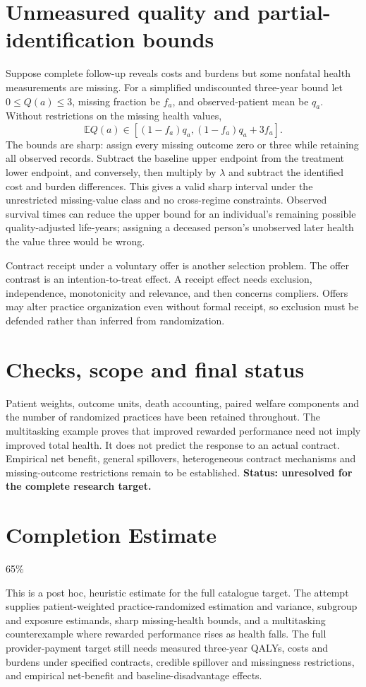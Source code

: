 \documentclass[11pt]{article}
\newcommand{\E}{\mathbb E}
\begin{document}
\section*{Unmeasured quality and partial-identification bounds}
Suppose complete follow-up reveals costs and burdens but some nonfatal health measurements are missing. For a simplified undiscounted three-year bound let $0\leq Q(a)\leq3$, missing fraction be $f_a$, and observed-patient mean be $q_a$. Without restrictions on the missing health values,
\[
 \E Q(a)\in[(1-f_a)q_a,(1-f_a)q_a+3f_a].
\]
The bounds are sharp: assign every missing outcome zero or three while retaining all observed records. Subtract the baseline upper endpoint from the treatment lower endpoint, and conversely, then multiply by $\lambda$ and subtract the identified cost and burden differences. This gives a valid sharp interval under the unrestricted missing-value class and no cross-regime constraints. Observed survival times can reduce the upper bound for an individual's remaining possible quality-adjusted life-years; assigning a deceased person's unobserved later health the value three would be wrong.

Contract receipt under a voluntary offer is another selection problem. The offer contrast is an intention-to-treat effect. A receipt effect needs exclusion, independence, monotonicity and relevance, and then concerns compliers. Offers may alter practice organization even without formal receipt, so exclusion must be defended rather than inferred from randomization.

\section*{Checks, scope and final status}
Patient weights, outcome units, death accounting, paired welfare components and the number of randomized practices have been retained throughout. The multitasking example proves that improved rewarded performance need not imply improved total health. It does not predict the response to an actual contract. Empirical net benefit, general spillovers, heterogeneous contract mechanisms and missing-outcome restrictions remain to be established. \textbf{Status: unresolved for the complete research target.}

\section{Completion Estimate}
65\%

This is a post hoc, heuristic estimate for the full catalogue target.
The attempt supplies patient-weighted practice-randomized estimation and variance, subgroup and exposure estimands, sharp missing-health bounds, and a multitasking counterexample where rewarded performance rises as health falls. The full provider-payment target still needs measured three-year QALYs, costs and burdens under specified contracts, credible spillover and missingness restrictions, and empirical net-benefit and baseline-disadvantage effects.
\end{document}
